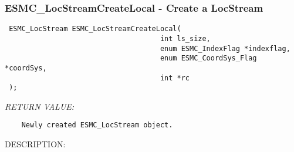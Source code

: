  
\setlength{\oldparskip}{\parskip}
\setlength{\parskip}{1.5ex}
\setlength{\oldparindent}{\parindent}
\setlength{\parindent}{0pt}
\setlength{\oldbaselineskip}{\baselineskip}
\setlength{\baselineskip}{11pt}
 
\def\bv{\begin{verbatim}}
\def\ev{\end{verbatim}}
\def\be{\begin{equation}}
\def\ee{\end{equation}}
\def\bea{\begin{eqnarray}}
\def\eea{\end{eqnarray}}
\def\bi{\begin{itemize}}
\def\ei{\end{itemize}}
\def\bn{\begin{enumerate}}
\def\en{\end{enumerate}}
\def\bd{\begin{description}}
\def\ed{\end{description}}
\def\({\left (}
\def\){\right )}
\def\[{\left [}
\def\]{\right ]}
\def\<{\left  \langle}
\def\>{\right \rangle}
\def\cI{{\cal I}}
\def\diag{\mathop{\rm diag}}
\def\tr{\mathop{\rm tr}}


 
\subsubsection [ESMC\_LocStreamCreateLocal] {ESMC\_LocStreamCreateLocal - Create a LocStream}


  
\begin{verbatim} ESMC_LocStream ESMC_LocStreamCreateLocal(
                                     int ls_size,
                                     enum ESMC_IndexFlag *indexflag,
                                     enum ESMC_CoordSys_Flag *coordSys,
                                     int *rc
 );
 \end{verbatim}{\em RETURN VALUE:}
\begin{verbatim}    Newly created ESMC_LocStream object.\end{verbatim}
{\sf DESCRIPTION:\\ }



